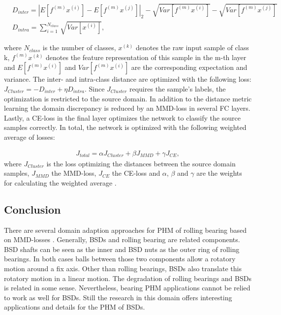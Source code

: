 \begin{equation}
    \begin{aligned}
       &D_{inter} = |E[f^{(m)}x^{(i)}]-E[f^{(m)}x^{(j)}]|_{2}-\sqrt{Var[f^{(m)}x^{(i)}]}-\sqrt{Var[f^{(m)}x^{(j)}]}\\
       &D_{intra} = 
        \sum_{i=1}^{N_{class}} \sqrt{Var[x^{(i)}]},
    \end{aligned}
\end{equation}

where $N_{class}$ is the number of classes, $x^{(k)}$ denotes the raw input sample of class k, $f^{(m)}x^{(k)}$ denotes the feature representation of this sample in the m-th layer and $E[f^{(m)}x^{(i)}]$ and $Var[f^{(m)}x^{(i)}]$ are the corresponding expectation and variance. The inter- and intra-class distance are optimized with the following loss: $J_{Cluster} = - D_{inter} + \eta D_{intra}$. Since $J_{Cluster}$ requires the sample's labels, the optimization is restricted to the source domain. In addition to the distance metric learning the domain discrepancy is reduced by an MMD-loss in several FC layers. Lastly, a CE-loss in the final layer optimizes the network to classify the source samples correctly. In total, the network is optimized with the following weighted average of losses: 

\begin{equation}
    \begin{aligned}
    J_{total} = \alpha J_{Cluster} + \beta J_{MMD} + \gamma J_{CE}, 
    \end{aligned}
\end{equation}
where $J_{Cluster}$ is the loss optimizing the distances between the source domain samples, $J_{MMD}$ the MMD-loss,  $J_{CE}$ the CE-loss and $\alpha$, $\beta$ and $\gamma$ are the weights for calculating the weighted average \cite{Li2018}.

\subsection{Conclusion}
There are several domain adaption approaches for PHM of rolling bearing based on MMD-losses \cite{AN201942} \cite{Li2018} \cite{Guo2019} \cite{Singh2019} \cite{Kang2020}. Generally, BSDs and rolling bearing are related components. BSD shafts can be seen as the inner and BSD nuts as the outer ring of rolling bearings. In both cases balls between those two components allow a rotatory motion around a fix axis. Other than rolling bearings, BSDs also translate this rotatory motion in a linear motion. The degradation of rolling bearings and BSDs is related in some sense. Nevertheless, bearing PHM applications cannot be relied to work as well for BSDs. Still the research in this domain offers interesting applications and details for the PHM of BSDs. 




